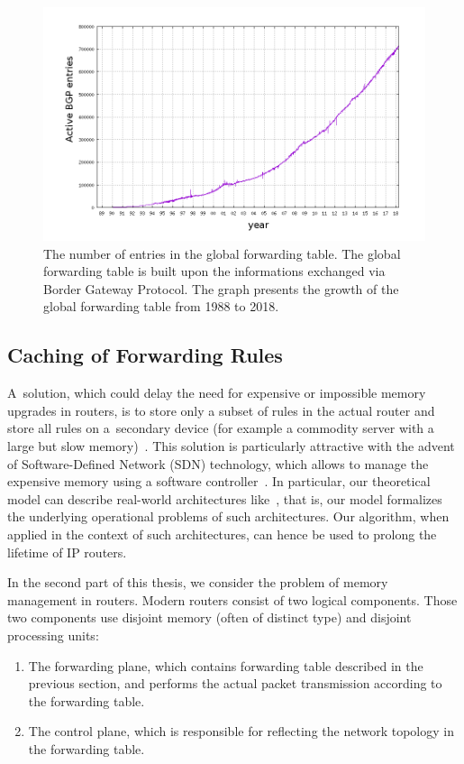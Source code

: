 \begin{figure}[t]
\centering
\includegraphics[width=0.59\columnwidth]{figs/bgp-entries.png}
\caption{The number of entries in the global forwarding table. The global forwarding table is built upon the informations exchanged via Border Gateway Protocol. The graph presents the growth of the global forwarding table from 1988 to 2018.}\label{fig:bgp-entries}
\vspace{-1em}
\end{figure}

\subsection{Caching of Forwarding Rules}

A~solution, which could delay
the need for expensive or impossible memory upgrades in routers, is to store
only a subset of rules in the actual router and store all rules on a~secondary
device (for example a commodity server with a large but slow
memory)~\cite{cacheflow,route-caching-flat,prefix-caching,fib-caching-non-overlapping,fibium-zipf}.
This solution is particularly attractive with the advent of Soft\-ware-Defined
Network (SDN) technology, which allows to manage the expensive memory using a
software controller~\cite{cacheflow,fibium-zipf}. In particular, our
theoretical model can describe real-world architectures
like~\cite{cacheflow,fibium-zipf},
that is, our model formalizes the underlying operational
problems of such architectures. Our 
algorithm, when applied in the context of such architectures, can 
hence be used to prolong the lifetime of IP routers.


In the second part of this thesis, we consider the problem of memory management in routers.
Modern routers consist of two logical components. Those two components use disjoint memory (often of distinct type) and disjoint processing units:
\begin{enumerate}
  \item The forwarding plane, which  contains forwarding table described in the previous section, and performs the actual packet transmission according to the forwarding table.
  \item The control plane, which is responsible for reflecting the network topology in the forwarding table.
\end{enumerate}

